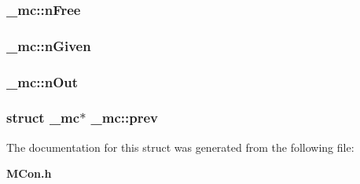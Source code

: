 \subsubsection{ \_\-mc::n\-Free}\label{struct__mc_m6}


\subsubsection{ \_\-mc::n\-Given}\label{struct__mc_m4}


\subsubsection{ \_\-mc::n\-Out}\label{struct__mc_m5}


\subsubsection{\setlength{\rightskip}{0pt plus 5cm}struct \_\-mc$\ast$ \_\-mc::prev}\label{struct__mc_m1}




The documentation for this struct was generated from the following file:\begin{CompactItemize}
\item 
{\bf MCon.h}\end{CompactItemize}
